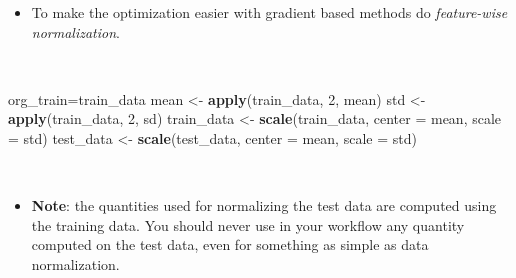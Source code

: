 \documentclass[
  10pt,
  ignorenonframetext,
]{beamer}
\newenvironment{Shaded}{\begin{snugshade}}{\end{snugshade}}
\newcommand{\AttributeTok}[1]{\textcolor[rgb]{0.13,0.29,0.53}{#1}}
\newcommand{\DecValTok}[1]{\textcolor[rgb]{0.00,0.00,0.81}{#1}}
\newcommand{\FunctionTok}[1]{\textcolor[rgb]{0.13,0.29,0.53}{\textbf{#1}}}
\newcommand{\NormalTok}[1]{#1}
\newcommand{\OtherTok}[1]{\textcolor[rgb]{0.56,0.35,0.01}{#1}}
\providecommand{\tightlist}{%
  \setlength{\itemsep}{0pt}\setlength{\parskip}{0pt}}
\begin{document}
\begin{frame}[fragile]
\begin{itemize}
\tightlist
\item
  To make the optimization easier with gradient based methods do
  \emph{feature-wise normalization}.
\end{itemize}

\(~\)

\scriptsize

\begin{Shaded}
\begin{Highlighting}[]
\NormalTok{org\_train}\OtherTok{=}\NormalTok{train\_data}
\NormalTok{mean }\OtherTok{\textless{}{-}} \FunctionTok{apply}\NormalTok{(train\_data, }\DecValTok{2}\NormalTok{, mean)}
\NormalTok{std }\OtherTok{\textless{}{-}} \FunctionTok{apply}\NormalTok{(train\_data, }\DecValTok{2}\NormalTok{, sd)}
\NormalTok{train\_data }\OtherTok{\textless{}{-}} \FunctionTok{scale}\NormalTok{(train\_data, }\AttributeTok{center =}\NormalTok{ mean, }\AttributeTok{scale =}\NormalTok{ std)}
\NormalTok{test\_data }\OtherTok{\textless{}{-}} \FunctionTok{scale}\NormalTok{(test\_data, }\AttributeTok{center =}\NormalTok{ mean, }\AttributeTok{scale =}\NormalTok{ std)}
\end{Highlighting}
\end{Shaded}

\(~\)

\normalsize

\begin{itemize}
\tightlist
\item
  \textbf{Note}: the quantities used for normalizing the test data are
  computed using the training data. You should never use in your
  workflow any quantity computed on the test data, even for something as
  simple as data normalization.
\end{itemize}
\end{frame}
\end{document}
